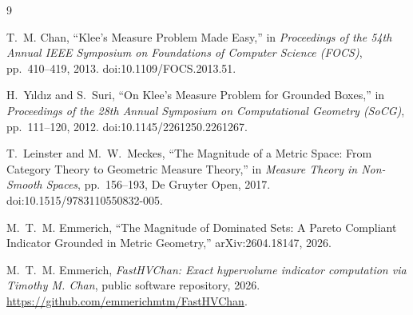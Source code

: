 \documentclass[12pt,a4paper]{article}
\theoremstyle{definition}
\newcommand{\1}{\mathbf 1}
\begin{document}
\begin{thebibliography}{9}

T.~M. Chan,
\newblock ``Klee's Measure Problem Made Easy,''
\newblock in \emph{Proceedings of the 54th Annual IEEE Symposium on Foundations of Computer Science (FOCS)}, pp.~410--419, 2013.
\newblock doi:10.1109/FOCS.2013.51.

H.~Y\i ld\i z and S.~Suri,
\newblock ``On Klee's Measure Problem for Grounded Boxes,''
\newblock in \emph{Proceedings of the 28th Annual Symposium on Computational Geometry (SoCG)}, pp.~111--120, 2012.
\newblock doi:10.1145/2261250.2261267.

T.~Leinster and M.~W.~Meckes,
\newblock ``The Magnitude of a Metric Space: From Category Theory to Geometric Measure Theory,''
\newblock in \emph{Measure Theory in Non-Smooth Spaces}, pp.~156--193, De Gruyter Open, 2017.
\newblock doi:10.1515/9783110550832-005.

M.~T.~M. Emmerich,
\newblock ``The Magnitude of Dominated Sets: A Pareto Compliant Indicator Grounded in Metric Geometry,''
\newblock arXiv:2604.18147, 2026.

M.~T.~M. Emmerich,
\newblock \emph{FastHVChan: Exact hypervolume indicator computation via Timothy M. Chan}, public software repository, 2026.
\newblock \url{https://github.com/emmerichmtm/FastHVChan}.

\end{thebibliography}
\end{document}
